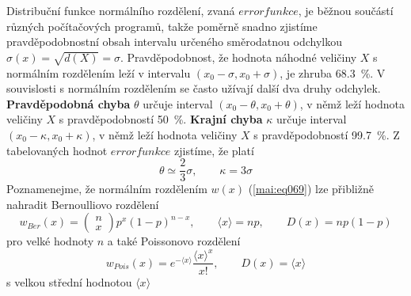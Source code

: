 \begin{example}
  Distribuční funkce normálního rozdělení, zvaná \(errorfunkce\), je běžnou součástí různých 
  počítačových programů, takže poměrně snadno zjistíme pravděpodobnostní obsah intervalu určeného 
  směrodatnou odchylkou \(\sigma(x) = \sqrt{d(X)} = \sigma\). Pravděpodobnost, že hodnota náhodné 
  veličiny \(X\) s normálním rozdělením leží v intervalu \((x_0 - \sigma, x_0 + \sigma)\), je 
  zhruba \SI{68.3}{\percent}. V souvislosti s normálním rozdělením se často užívají další 
  dva druhy odchylek. \textbf{Pravděpodobná chyba} \(\theta\) určuje interval \((x_0 - \theta, x_0 
  + \theta)\), v  němž leží hodnota veličiny \(X\) s pravděpodobností \SI{50}{\percent}. 
  \textbf{Krajní chyba} \(\kappa\) určuje interval \((x_0 - \kappa, x_0 + \kappa)\), v němž leží 
  hodnota veličiny \(X\) s pravděpodobností \SI{99.7}{\percent}. Z tabelovaných hodnot 
  \(errorfunkce\) zjistíme, že platí
  \begin{equation}\label{mai:eq71}
   \theta \simeq \dfrac{2}{3}\sigma, \qquad \kappa = 3\sigma
  \end{equation}
  Poznamenejme, že normálním rozdělením \(w(x)\) (\ref{mai:eq069}) lze přibližně nahradit 
  Bernoulliovo rozdělení
  \begin{equation*}
    w_{Ber}(x) = \begin{pmatrix} n \\ x \end{pmatrix}p^x(1 - p)^{n-x},\qquad
    \langle x \rangle = np, \qquad
    D(x) = np(1-p)
  \end{equation*}
  pro velké hodnoty \(n\) a také Poissonovo rozdělení
  \begin{equation*}
    w_{Pois}(x) = e^{-\langle x \rangle}\dfrac{\langle x \rangle^x}{x!}, \qquad 
    D(x) = \langle x \rangle
  \end{equation*}
  s velkou střední hodnotou \(\langle x \rangle\)
\normalsize
\end{example}